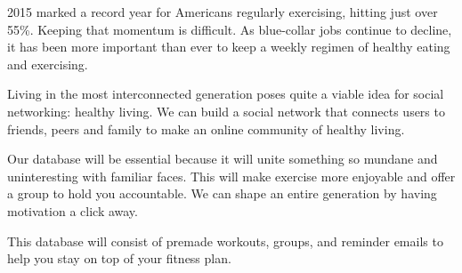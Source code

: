 2015 marked a record year for Americans regularly exercising, hitting just over 55\%. Keeping that momentum is difficult. As blue-collar jobs continue to decline, it has been more important than ever to keep a weekly regimen of healthy eating and exercising.

Living in the most interconnected generation poses quite a viable idea for social networking: healthy living. We can build a social network that connects users to friends, peers and family to make an online community of healthy living.

Our database will be essential because it will unite something so mundane and uninteresting with familiar faces. This will make exercise more enjoyable and offer a group to hold you accountable. We can shape an entire generation by having motivation a click away.

This database will consist of premade workouts, groups, and reminder emails to help you stay on top of your fitness plan.